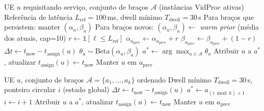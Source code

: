 \begin{algorithm}[t]
\caption{Roteamento MAB com Thompson Sampling por UE}
\label{alg:mab}
\begin{algorithmic}[1]
\Require UE $u$ requisitando serviço, conjunto de braços $\mathcal{A}$ (instâncias VidProc ativas)
\Require Referência de latência $L_{\text{ref}} = 100$\,ms, dwell mínimo $T_{\text{dwell}} = 30$\,s
\Statex
\State {}
\State Para braços que persistem: manter $(\alpha_a, \beta_a)$
\State Para braços novos: $(\alpha_a, \beta_a) \gets$ \textit{warm prior} (média dos atuais, cap=10)
\Statex
\State {}
    \State $r \gets \mathbb{1}[\ell \leq L_{\text{ref}}]$ 
    \State $\alpha_{a_{\text{prev}}} \gets \alpha_{a_{\text{prev}}} + r$
    \State $\beta_{a_{\text{prev}}} \gets \beta_{a_{\text{prev}}} + (1 - r)$
\EndIf
\Statex
\State {}
\State $\Delta t \gets t_{\text{now}} - t_{\text{assign}}(u)$
        \State $\theta_a \sim \text{Beta}(\alpha_a, \beta_a)$
    \EndFor
    \State $a^{*} \gets \arg\max_{a \in \mathcal{A}} \theta_a$
    \State Atribuir $u$ a $a^{*}$, atualizar $t_{\text{assign}}(u) \gets t_{\text{now}}$
\Else
    \State Manter $u$ em $a_{\text{prev}}$
\EndIf
\end{algorithmic}
\end{algorithm}


\begin{algorithm}[t]
\caption{Roteamento Round Robin (baseline)}
\label{alg:rr}
\begin{algorithmic}[1]
\Require UE $u$, conjunto de braços $\mathcal{A} = \{a_1, \ldots, a_k\}$ ordenado
\Require Dwell mínimo $T_{\text{dwell}} = 30$\,s, ponteiro circular $i$ (estado global)
\Statex
\State $\Delta t \gets t_{\text{now}} - t_{\text{assign}}(u)$
    \State $a^{*} \gets a_{(i \bmod k) + 1}$ 
    \State $i \gets i + 1$
    \State Atribuir $u$ a $a^{*}$, atualizar $t_{\text{assign}}(u) \gets t_{\text{now}}$
\Else
    \State Manter $u$ em $a_{\text{prev}}$
\EndIf
\end{algorithmic}
\end{algorithm}


